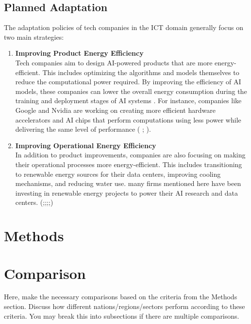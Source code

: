 \documentclass[12pt]{article}
\begin{document}
\subsection*{Planned Adaptation}
The adaptation policies of tech companies in the ICT domain generally focus on two main strategies:
\begin{enumerate}
    \item \textbf{Improving Product Energy Efficiency} \\ Tech companies aim to design AI-powered products that are more energy-efficient. This includes optimizing the algorithms and 
    models themselves to reduce the computational power required. By improving the efficiency of AI models, these companies can lower the overall energy consumption during 
    the training and deployment stages of AI systems . For instance, companies like Google and Nvidia are working on creating more efficient hardware accelerators and AI 
    chips that perform computations using less power while delivering the same level of performance (\cite{google_2024_environmental} ; \cite{nvidia_2024}).
    \item \textbf{Improving Operational Energy Efficiency} \\ In addition to product improvements, companies are also focusing on making their operational processes more energy-efficient. This includes 
    transitioning to renewable energy sources for their data centers, improving cooling mechanisms, and reducing water use. many firms mentioned here have been investing in renewable energy 
    projects to power their AI research and data centers. (\cite{apple_2024_environmental};\cite{amazon_2023_amazon};\cite{meta_sustainability_2023};\cite{google_2024_environmental};\cite{nvidia_2024}) 
     
\end{enumerate}

\section*{Methods}






\section*{Comparison}
Here, make the necessary comparisons based on the criteria from the Methods section. Discuss how different nations/regions/sectors perform according to these criteria. You may break this into subsections if there are multiple comparisons.
\end{document}
